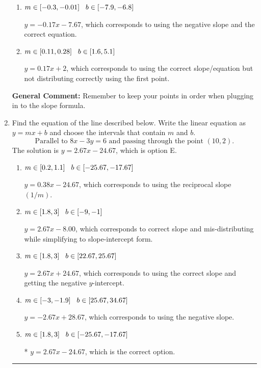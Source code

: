 \documentclass{extbook}[14pt]
\newcommand{\litem}[1]{\item #1

\rule{\textwidth}{0.4pt}}
\begin{document}
\begin{enumerate}
{\begin{enumerate}[label=\Alph*.]
* $y = 0.17x -6.33$, which is the correct option.
\item \( m \in [-0.3, -0.01] \hspace*{3mm} b \in [-7.9, -6.8] \)

 $y = -0.17x -7.67$, which corresponds to using the negative slope and the correct equation.
\item \( m \in [0.11, 0.28] \hspace*{3mm} b \in [1.6, 5.1] \)

 $y = 0.17x + 2$, which corresponds to using the correct slope/equation but not distributing correctly using the first point.
\end{enumerate}

\textbf{General Comment:} Remember to keep your points in order when plugging in to the slope formula.
}
\litem{
Find the equation of the line described below. Write the linear equation as $ y=mx+b $ and choose the intervals that contain $m$ and $b$.
\[ \text{Parallel to } 8 x - 3 y = 6 \text{ and passing through the point } (10, 2). \]The solution is \( y = 2.67x - 24.67 \), which is option E.\begin{enumerate}[label=\Alph*.]
\item \( m \in [0.2, 1.1] \hspace*{3mm} b \in [-25.67, -17.67] \)

 $y = 0.38x - 24.67$, which corresponds to using the reciprocal slope $(1/m)$.
\item \( m \in [1.8, 3] \hspace*{3mm} b \in [-9, -1] \)

 $y = 2.67x - 8.00$, which corresponds to correct slope and mis-distributing while simplifying to slope-intercept form.
\item \( m \in [1.8, 3] \hspace*{3mm} b \in [22.67, 25.67] \)

 $y = 2.67x + 24.67$, which corresponds to using the correct slope and getting the negative $y$-intercept.
\item \( m \in [-3, -1.9] \hspace*{3mm} b \in [25.67, 34.67] \)

 $y = -2.67x + 28.67$, which corresponds to using the negative slope.
\item \( m \in [1.8, 3] \hspace*{3mm} b \in [-25.67, -17.67] \)

* $y = 2.67x - 24.67$, which is the correct option.
\end{enumerate}

}
\end{enumerate}
\end{document}

